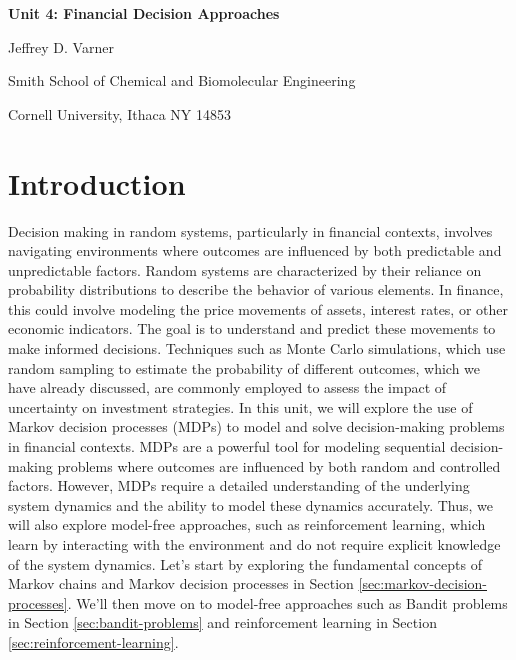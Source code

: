 \documentclass[11pt]{article}
\theoremstyle{definition}
\begin{document}
{\par\centering\textbf{\Large Unit 4: Financial Decision Approaches}}
\vspace{0.2in}
{\par \centering \large{Jeffrey D. Varner}}
\vspace{0.05in}
{\par \centering \large{Smith School of Chemical and Biomolecular Engineering}}
{\par \centering \large{Cornell University, Ithaca NY 14853}}

\date{}
\thispagestyle{empty}

\setcounter{page}{1}

\tableofcontents
\clearpage
\listoffigures
\clearpage
\listofalgorithms
\clearpage

\section{Introduction}
Decision making in random systems, particularly in financial contexts, involves navigating environments where outcomes are influenced by both predictable and unpredictable factors. 
Random systems are characterized by their reliance on probability distributions to describe the behavior of various elements. 
In finance, this could involve modeling the price movements of assets, interest rates, or other economic indicators. 
The goal is to understand and predict these movements to make informed decisions.
Techniques such as Monte Carlo simulations, which use random sampling to estimate the probability of different outcomes, which we have already discussed, are commonly employed to assess the impact of uncertainty on investment strategies.
In this unit, we will explore the use of Markov decision processes (MDPs) to model and solve decision-making problems in financial contexts.
MDPs are a powerful tool for modeling sequential decision-making problems where outcomes are influenced by both random and controlled factors.
However, MDPs require a detailed understanding of the underlying system dynamics and the ability to model these dynamics accurately.
Thus, we will also explore model-free approaches, such as reinforcement learning, which learn by interacting with the environment and do not require explicit knowledge of the system dynamics.
Let's start by exploring the fundamental concepts of Markov chains and Markov decision processes
in Section \ref{sec:markov-decision-processes}.
We'll then move on to model-free approaches such as Bandit problems in Section \ref{sec:bandit-problems} 
and reinforcement learning in Section \ref{sec:reinforcement-learning}.
\end{document}
